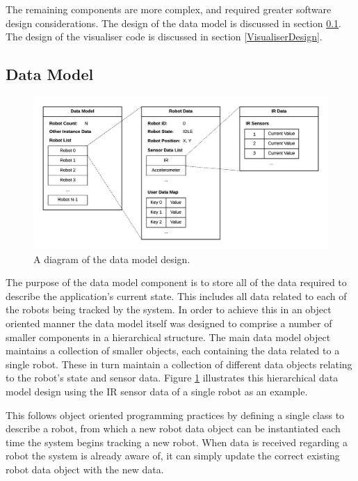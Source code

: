 The remaining components are more complex, and required greater software design considerations. The design of the data model is discussed in section \ref{DataModelDesign}. The design of the visualiser code is discussed in section \ref{VisualiserDesign}.

\subsection{Data Model} \label{DataModelDesign}
\begin{figure}[h]
	\centering
	\includegraphics[scale=0.7]{Figures/DataModel.png}
	\decoRule
	\caption[Data Model Diagram]{A diagram of the data model design.}
	\label{fig:DataModel}
\end{figure}

The purpose of the data model component is to store all of the data required to describe the application's current state. This includes all data related to each of the robots being tracked by the system. In order to achieve this in an object oriented manner the data model itself was designed to comprise a number of smaller components in a hierarchical structure. The main data model object maintains a collection of smaller objects, each containing the data related to a single robot. These in turn maintain a collection of different data objects relating to the robot's state and sensor data. Figure \ref{fig:DataModel} illustrates this hierarchical data model design using the IR sensor data of a single robot as an example.

This follows object oriented programming practices by defining a single class to describe a robot, from which a new robot data object can be instantiated each time the system begins tracking a new robot. When data is received regarding a robot the system is already aware of, it can simply update the correct existing robot data object with the new data.

